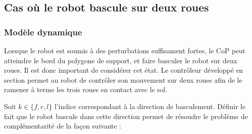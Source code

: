 			
			
		\subsection{Cas où le robot bascule sur deux roues}
			\subsubsection{Modèle dynamique}
			
				Lorsque le robot est soumis à des perturbations suffisament fortes, le CoP peut atteindre le bord du polygone de support, et faire basculer le robot sur deux roues.
				Il est donc important de considérer cet état. 
				Le contrôleur développé en section  permet au robot de contrôler son mouvement sur deux roues afin de le ramener à terme les trois roues en contact avec le sol.
				
				Soit $k\in\{f,r,l\}$ l'indice correspondant à la direction de basculement. 
				Définir le fait que le robot bascule dans cette direction  permet de résoudre le problème de complémentarité de la façon suivante :
				
